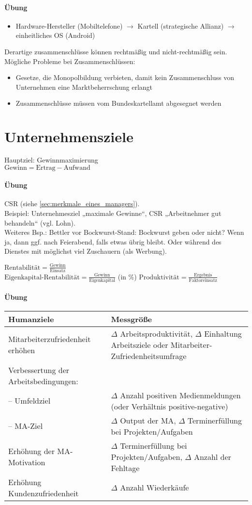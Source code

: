 \paragraph{Übung} 
\begin{itemize}
\item Hardware-Hersteller (Mobiltelefone) $\to$ Kartell (strategische Allianz) $\to$ einheitliches OS (Android)
\end{itemize}
Derartige zusammenschlüsse können rechtmäßig und nicht-rechtmäßig sein.
Mögliche Probleme bei Zusammenschlüssen:
\begin{itemize}
\item Gesetze, die Monopolbildung verbieten, damit kein Zusammenschluss von Unternehmen eine Marktbeherrschung erlangt
\item Zusammenschlüsse müssen vom Bundeskartellamt abgesegnet werden
\end{itemize}

\section{Unternehmensziele}
Hauptziel: Gewinnmaximierung\\
$\text{Gewinn} = \text{Ertrag} - \text{Aufwand}$
\paragraph{Übung} CSR (siehe \ref{sec:merkmale_eines_managers}). \\
Beispiel: Unternehmesziel „maximale Gewinne“, CSR „Arbeitnehmer gut behandeln“ (vgl. Lohn).\\
Weiteres Bsp.: Bettler vor Bockwurst-Stand: Bockwurst geben oder nicht? Wenn ja, dann ggf. nach Feierabend, falls etwas übrig bleibt. Oder während des Dienstes mit möglichst viel Zuschauern (als Werbung).

$\text{Rentabilität} = \frac{\text{Gewinn}}{\text{Einsatz}}$\\
$\text{Eigenkapital-Rentabilität} = \frac{\text{Gewinn}}{\text{Eigenkapital}}$ (in \%)
$\text{Produktivität} = \frac{\text{Ergebnis}}{\text{Faktoreinsatz}}$
\paragraph{Übung}\parskp
\begin{tabular}{L{0.3} L{0.7}}
Humanziele & Messgröße\tabularnewline
\hline
Mitarbeiterzufriedenheit erhöhen & $\Delta$ Arbeitsproduktivität, $\Delta$ Einhaltung Arbeitsziele oder Mitarbeiter-Zufriedenheitsumfrage\tabularnewline
Verbessertung der Arbeitsbedingungen: & \tabularnewline
-- Umfeldziel & $\Delta$ Anzahl positiven Medienmeldungen (oder Verhältnis positive-negative)\tabularnewline
-- MA-Ziel & $\Delta$ Output der MA, $\Delta$ Terminerfüllung bei Projekten/Aufgaben \tabularnewline
Erhöhung der MA-Motivation & $\Delta$ Terminerfüllung bei Projekten/Aufgaben, $\Delta$ Anzahl der Fehltage \tabularnewline
Erhöhung Kundenzufriedenheit & $\Delta$ Anzahl Wiederkäufe \tabularnewline
\end{tabular}

